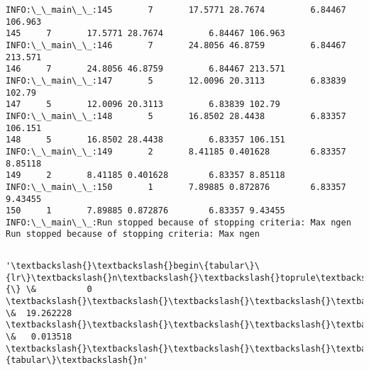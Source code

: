 \documentclass[11pt]{article}
\begin{document}
\begin{Verbatim}[commandchars=\\\{\}]
INFO:\_\_main\_\_:145       7       17.5771 28.7674         6.84467 106.963
145     7       17.5771 28.7674         6.84467 106.963
INFO:\_\_main\_\_:146       7       24.8056 46.8759         6.84467 213.571
146     7       24.8056 46.8759         6.84467 213.571
INFO:\_\_main\_\_:147       5       12.0096 20.3113         6.83839 102.79
147     5       12.0096 20.3113         6.83839 102.79
INFO:\_\_main\_\_:148       5       16.8502 28.4438         6.83357 106.151
148     5       16.8502 28.4438         6.83357 106.151
INFO:\_\_main\_\_:149       2       8.41185 0.401628        6.83357 8.85118
149     2       8.41185 0.401628        6.83357 8.85118
INFO:\_\_main\_\_:150       1       7.89885 0.872876        6.83357 9.43455
150     1       7.89885 0.872876        6.83357 9.43455
INFO:\_\_main\_\_:Run stopped because of stopping criteria: Max ngen
Run stopped because of stopping criteria: Max ngen
    \end{Verbatim}

    \begin{Verbatim}[commandchars=\\\{\}]

    \end{Verbatim}

            \begin{tcolorbox}[breakable, size=fbox, boxrule=.5pt, pad at break*=1mm, opacityfill=0]
\begin{Verbatim}[commandchars=\\\{\}]
'\textbackslash{}\textbackslash{}begin\{tabular\}\{lr\}\textbackslash{}n\textbackslash{}\textbackslash{}toprule\textbackslash{}n\{\} \&          0 \textbackslash{}\textbackslash{}\textbackslash{}\textbackslash{}\textbackslash{}n\textbackslash{}\textbackslash{}midrule\textbackslash{}nchi\textbackslash{}\textbackslash{}\_square
\&  19.262228 \textbackslash{}\textbackslash{}\textbackslash{}\textbackslash{}\textbackslash{}np\textbackslash{}\textbackslash{}\_value    \&   0.013518
\textbackslash{}\textbackslash{}\textbackslash{}\textbackslash{}\textbackslash{}n\textbackslash{}\textbackslash{}bottomrule\textbackslash{}n\textbackslash{}\textbackslash{}end\{tabular\}\textbackslash{}n'
\end{Verbatim}
\end{tcolorbox}
        
\end{document}
